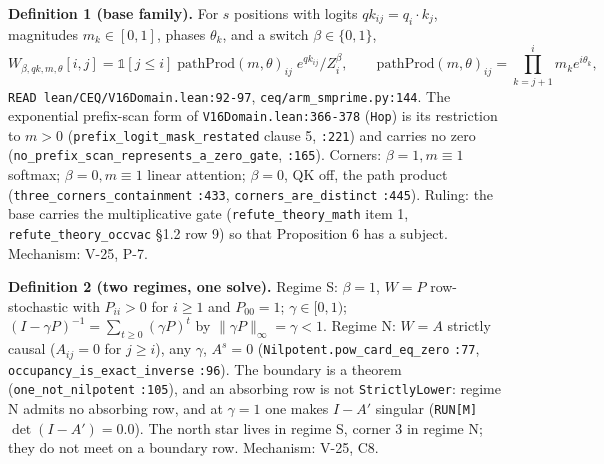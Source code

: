\documentclass[11pt,a4paper]{article}
\theoremstyle{plain}
\theoremstyle{definition}
\theoremstyle{remark}
\begin{document}
\textbf{Definition 1 (base family).} For \(s\) positions with logits
\(qk_{ij}=q_i\cdot k_j\), magnitudes \(m_k\in[0,1]\), phases
\(\theta_k\), and a switch \(\beta\in\{0,1\}\),
\[W_{\beta,qk,m,\theta}[i,j]=\mathbb 1[j\le i]\;\mathrm{pathProd}(m,\theta)_{ij}\;e^{qk_{ij}}/Z_i^{\beta},\qquad
\mathrm{pathProd}(m,\theta)_{ij}=\prod_{k=j+1}^{i} m_k e^{i\theta_k},\]
\texttt{READ\ lean/CEQ/V16Domain.lean:92-97},
\texttt{ceq/arm\_smprime.py:144}. The exponential prefix-scan form of
\texttt{V16Domain.lean:366-378} (\texttt{Hop}) is its restriction to
\(m>0\) (\texttt{prefix\_logit\_mask\_restated} clause 5, \texttt{:221})
and carries no zero
(\texttt{no\_prefix\_scan\_represents\_a\_zero\_gate}, \texttt{:165}).
Corners: \(\beta=1,m\equiv1\) softmax; \(\beta=0,m\equiv1\) linear
attention; \(\beta=0\), QK off, the path product
(\texttt{three\_corners\_containment} \texttt{:433},
\texttt{corners\_are\_distinct} \texttt{:445}). Ruling: the base carries
the multiplicative gate (\texttt{refute\_theory\_math} item 1,
\texttt{refute\_theory\_occvac} §1.2 row 9) so that Proposition 6 has a
subject. Mechanism: V-25, P-7.

\textbf{Definition 2 (two regimes, one solve).} Regime S: \(\beta=1\),
\(W=P\) row-stochastic with \(P_{ii}>0\) for \(i\ge1\) and \(P_{00}=1\);
\(\gamma\in[0,1)\); \((I-\gamma P)^{-1}=\sum_{t\ge0}(\gamma P)^t\) by
\(\|\gamma P\|_\infty=\gamma<1\). Regime N: \(W=A\) strictly causal
(\(A_{ij}=0\) for \(j\ge i\)), any \(\gamma\), \(A^s=0\)
(\texttt{Nilpotent.pow\_card\_eq\_zero} \texttt{:77},
\texttt{occupancy\_is\_exact\_inverse} \texttt{:96}). The boundary is a
theorem (\texttt{one\_not\_nilpotent} \texttt{:105}), and an absorbing
row is not \texttt{StrictlyLower}: regime N admits no absorbing row, and
at \(\gamma=1\) one makes \(I-A'\) singular (\texttt{RUN{[}M{]}}
\(\det(I-A')=0.0\)). The north star lives in regime S, corner 3 in
regime N; they do not meet on a boundary row. Mechanism: V-25, C8.
\end{document}
